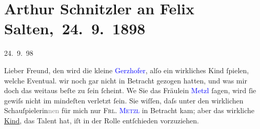 

\renewcommand{\erwaehntePersonen}{Personen: Camilla Gerzhofer, Carl Karlweis, Felix Salten, Ottilie Salten}
\renewcommand{\erwaehnteOrte}{Orte: Volkstheater, Wien}
\renewcommand{\erwaehnteWerke}{Werke: Das Vermächtnis. Schauspiel in drei Akten, Das liebe Ich}
\section[ Arthur Schnitzler an Felix Salten, 24. 9. 1898]{Arthur Schnitzler an Felix Salten, 24. 9. 1898}
\nopagebreak{}
\rehead{ }\normalsize\beginnumbering{}
\toendnotes[C]{\smallbreak\pagebreak[2]}
\toendnotes[C]{\smallbreak}
\pstart
           \raggedleft{}{\pb}24. 9. 98\pend
           
\pstart{}Lieber Freund,\pend
\pstart
           den \label{K_L02966-1v}\label{K_L02966-1h} wird die kleine \textcolor{blue}{Gerzhofer}{}\ledrightnote{\textcolor{blue}{Camilla Gerzhofer}}, alſo ein
               wirkliches Kind ſpielen, welche Eventual. wir noch gar nicht in Betracht gezogen
               hatten, und was mir {\pb}doch das weitaus beſte
               zu ſein ſcheint. We{\geminationn} Sie das Fräulein \textcolor{blue}{Metzl}{}\ledrightnote{\textcolor{blue}{Ottilie Salten}} ſagen, wird ſie gewiſs nicht im mindeſten verletzt
               ſein. Sie wiſſen, daſs unter den wirklichen Schauſpielerin\textcolor{gray}{nen} für
               mich nur \textsc{Frl. \textcolor{blue}{Metzl}{}\ledrightnote{\textcolor{blue}{Ottilie Salten}}} in {\pb}Betracht kam; aber das wirkliche
                  \uline{Kind}, das Talent hat, iſt in der Rolle entſchieden
               vorzuziehen.\pend
           
